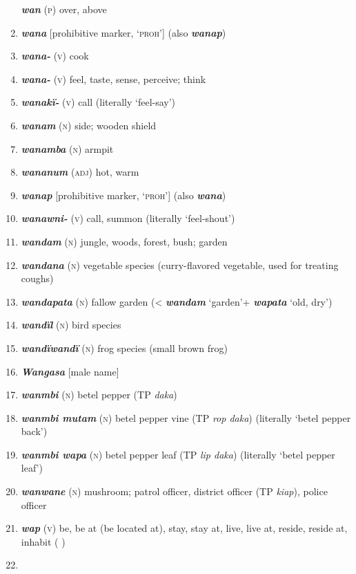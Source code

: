 \begin{enumerate}[noitemsep, label={}, align=left, widest=190, labelsep=1ex,leftmargin=*,itemindent=-10pt]
\textbf{\textit{wan}} (\textsc{p}) over, above \item 
\textbf{\textit{wana}} [prohibitive marker, ‘\textsc{proh}’] (also \textbf{\textit{wanap}}) \item 
\textbf{\textit{wana-}} (\textsc{v}) cook \item 
\textbf{\textit{wana-}} (\textsc{v}) feel, taste, sense, perceive; think \item 
\textbf{\textit{wanakï-}} (\textsc{v}) call (literally ‘feel-say’) \item 
\textbf{\textit{wanam}} (\textsc{n}) side; wooden shield \item 
\textbf{\textit{wanamba}} (\textsc{n}) armpit \item 
\textbf{\textit{wananum}} (\textsc{adj}) hot, warm \item 
\textbf{\textit{wanap}} [prohibitive marker, ‘\textsc{proh}’] (also \textbf{\textit{wana}}) \item 
\textbf{\textit{wanawni-}} (\textsc{v}) call, summon (literally ‘feel-shout’) \item 
\textbf{\textit{wandam}} (\textsc{n}) jungle, woods, forest, bush; garden \item 
\textbf{\textit{wandana}} (\textsc{n}) vegetable species (curry-flavored vegetable, used for treating \linebreak coughs) \item 
\textbf{\textit{wandapata}} (\textsc{n}) fallow garden (< \textbf{\textit{wandam}} ‘garden’+ \textbf{\textit{wapata}} ‘old, dry’) \item 
\textbf{\textit{wandïl}} (\textsc{n}) bird species \item 
\textbf{\textit{wandïwandï}} (\textsc{n}) frog species (small brown frog) \item 
\textbf{\textit{Wangasa}} [male name] \item 
\textbf{\textit{wanmbi}} (\textsc{n}) betel pepper (TP \textit{daka}) \item 
\textbf{\textit{wanmbi mutam}} (\textsc{n}) betel pepper vine (TP \textit{rop daka}) (literally ‘betel pepper back’) \item 
\textbf{\textit{wanmbi wapa}} (\textsc{n}) betel pepper leaf (TP \textit{lip daka}) (literally ‘betel pepper leaf’) \item 
\textbf{\textit{wanwane}} (\textsc{n}) mushroom; patrol officer, district officer (TP \textit{kiap}), police officer \item 
\textbf{\textit{wap}} (\textsc{v}) be, be at (be located at), stay, stay at, live, live at, reside, reside at, inhabit ( ) \item 

\end{enumerate}
